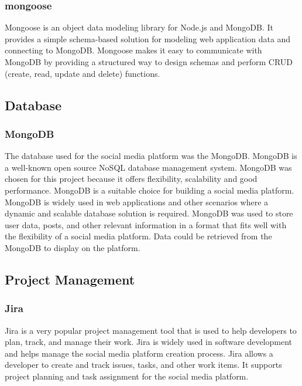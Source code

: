 \subsubsection{mongoose}
Mongoose is an object data modeling library for Node.js and MongoDB. It provides a simple schema-based solution for modeling web application data and connecting to MongoDB. Mongoose makes it easy to communicate with MongoDB by providing a structured way to design schemas and perform CRUD (create, read, update and delete) functions. 

\subsection{Database}
\subsubsection{MongoDB}
The database used for the social media platform was the MongoDB. MongoDB is a well-known open source NoSQL database management system. MongoDB was chosen for this project because it offers flexibility, scalability and good performance. MongoDB is a suitable choice for building a social media platform. MongoDB is widely used in web applications and other scenarios where a dynamic and scalable database solution is required. MongoDB was used to store user data, posts, and other relevant information in a format that fits well with the flexibility of a social media platform. Data could be retrieved from the MongoDB to display on the platform.

\subsection{Project Management}
\subsubsection{Jira}
Jira is a very popular project management tool that is used to help developers to plan, track, and manage their work. Jira is widely used in software development and helps manage the social media platform creation process. Jira allows a developer to create and track issues, tasks, and other work items. It supports project planning and task assignment for the social media platform.